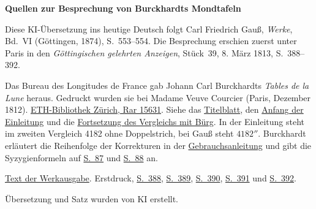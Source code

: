\clearpage\thispagestyle{empty}
\begin{center}\textbf{Quellen zur Besprechung von Burckhardts Mondtafeln}\end{center}
\noindent Diese KI-Übersetzung ins heutige Deutsch folgt Carl Friedrich Gauß, \textit{Werke}, Bd.~VI (Göttingen, 1874), S.~553--554. Die Besprechung erschien zuerst unter Paris in den \textit{Göttingischen gelehrten Anzeigen}, Stück~39, 8. März 1813, S.~388--392.
\par\smallskip\noindent Das Bureau des Longitudes de France gab Johann Carl Burckhardts \textit{Tables de la Lune} heraus. Gedruckt wurden sie bei Madame Veuve Courcier (Paris, Dezember 1812). \href{https://www.e-rara.ch/zut/content/titleinfo/21914185}{ETH-Bibliothek Zürich, Rar 15631}. Siehe das \href{https://www.e-rara.ch/i3f/v20/21914186/full/1650,/0/default.jpg}{Titelblatt}, den \href{https://www.e-rara.ch/i3f/v20/21914188/full/1650,/0/default.jpg}{Anfang der Einleitung} und die \href{https://www.e-rara.ch/i3f/v20/21914190/full/1650,/0/default.jpg}{Fortsetzung des Vergleichs mit Bürg}. In der Einleitung steht im zweiten Vergleich 4182 ohne Doppelstrich, bei Gauß steht \(4182''\). Burckhardt erläutert die Reihenfolge der Korrekturen in der \href{https://www.e-rara.ch/i3f/v20/21914193/full/1650,/0/default.jpg}{Gebrauchsanleitung} und gibt die Syzygienformeln auf \href{https://www.e-rara.ch/i3f/v20/21914281/full/1650,/0/default.jpg}{S.~87} und \href{https://www.e-rara.ch/i3f/v20/21914282/full/1650,/0/default.jpg}{S.~88} an.
\par\smallskip\noindent \href{https://gdz.sub.uni-goettingen.de/id/PPN236007467}{Text der Werkausgabe}. Erstdruck, \href{https://images.p.sub.uni-goettingen.de/iiif/image/gdz:PPN319721507_1813:00000390/full/1650,/0/default.jpg}{S.~388}, \href{https://images.p.sub.uni-goettingen.de/iiif/image/gdz:PPN319721507_1813:00000391/full/1650,/0/default.jpg}{S.~389}, \href{https://images.p.sub.uni-goettingen.de/iiif/image/gdz:PPN319721507_1813:00000392/full/1650,/0/default.jpg}{S.~390}, \href{https://images.p.sub.uni-goettingen.de/iiif/image/gdz:PPN319721507_1813:00000393/full/1650,/0/default.jpg}{S.~391} und \href{https://images.p.sub.uni-goettingen.de/iiif/image/gdz:PPN319721507_1813:00000394/full/1650,/0/default.jpg}{S.~392}.
\par\smallskip\noindent Übersetzung und Satz wurden von KI erstellt.
\clearpage
